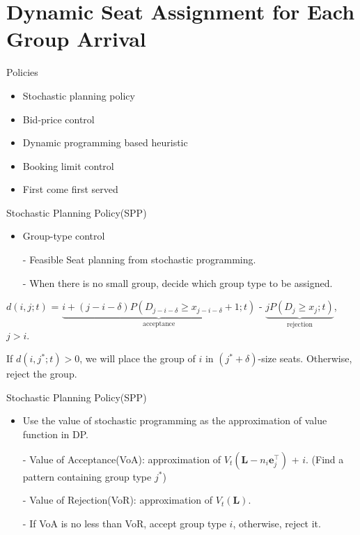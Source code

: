 
\section{Dynamic Seat Assignment for Each Group Arrival}
    \frame{\sectionpage}
    \begin{frame}{Policies}
      \begin{itemize}
        \item Stochastic planning policy
        \item Bid-price control
        \item Dynamic programming based heuristic
        \item Booking limit control
        \item First come first served
      \end{itemize}
    \end{frame}

    \begin{frame}{Stochastic Planning Policy(SPP)}
      \begin{itemize}
        \item Group-type control
        \item[-] Feasible Seat planning from stochastic programming.
        \item[-] When there is no small group, decide which group type to be assigned.
      \end{itemize}
      \vspace*{1cm}
      \small
      $d(i, j; t)$ = $\underbrace{i + (j-i-\delta)P(D_{j-i-\delta} \geq x_{j-i-\delta}+1; t)}_{\text{acceptance}}$ - $\underbrace{j P(D_{j} \geq x_{j}; t)}_{\text{rejection}}$, $j > i$.
      \vspace*{1cm}

      If $d(i, j^{*}; t) > 0$, we will place the group of $i$ in $(j^{*} + \delta)$-size seats. Otherwise, reject the group.
    \end{frame}

    \begin{frame}{Stochastic Planning Policy(SPP)}
      \begin{itemize}
        \item Use the value of stochastic programming as the approximation of value function in DP.

        \item[-] Value of Acceptance(VoA): approximation of $V_{t} (\mathbf{L}-n_i \mathbf{e}_{j}^{\top})$ + $i$. (Find a pattern containing group type $j^{*}$)
        
        \item[-] Value of Rejection(VoR): approximation of $V_{t} (\mathbf{L})$.

        \item[-] If VoA is no less than VoR, accept group type $i$, otherwise, reject it.
      \end{itemize}
    \end{frame}

